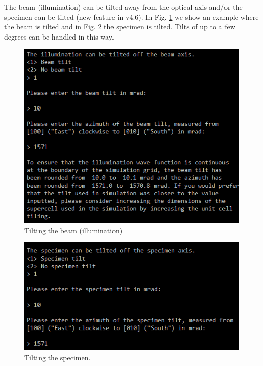 \documentclass[12pt,a4paper]{article}
\begin{document}
The beam (illumination) can be tilted away from the optical axis and/or the specimen can be tilted (new feature in v4.6). In Fig. \ref{fig:tilt_beam} we show an example where the beam is tilted and in Fig. \ref{fig:tilt_specimen} the specimen is tilted. Tilts of up to a few degrees can be handled in this way.
%
\begin{figure}[!h]
\begin{center}
    \includegraphics[scale=1.3]{tilt_beam.png}
\caption{Tilting the beam (illumination)}
\label{fig:tilt_beam}
\end{center}
\end{figure}
%
\begin{figure}[!h]
\begin{center}
    \includegraphics[scale=1.3]{tilt_specimen.png}
\caption{Tilting the specimen.}
\label{fig:tilt_specimen}
\end{center}
\end{figure}
\end{document}
